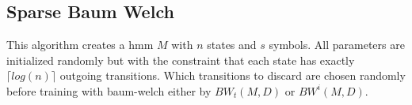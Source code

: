 \subsection{Sparse Baum Welch}
This algorithm creates a \gls{hmm} $M$ with $n$ states and $s$ symbols.
All parameters are initialized randomly but with the constraint that each state has exactly $\lceil log(n) \rceil$ outgoing transitions.
Which transitions to discard are chosen randomly before training with \gls{baum-welch} either by $BW_t(M, D)$ or $BW^i(M, D)$.